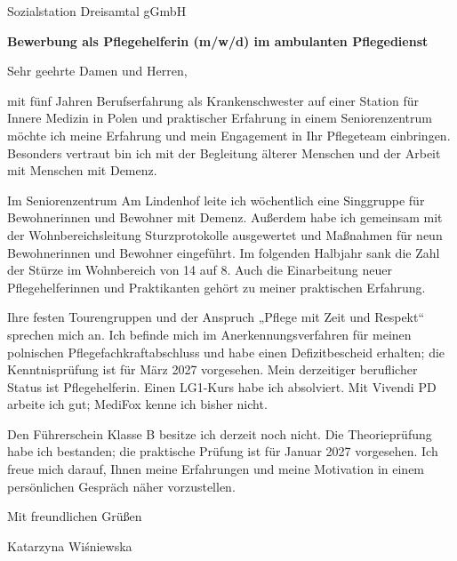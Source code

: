 \documentclass[11pt,a4paper]{article}
\begin{document}
Sozialstation Dreisamtal gGmbH

\vspace{1em}
\textbf{Bewerbung als Pflegehelferin (m/w/d) im ambulanten Pflegedienst}

\vspace{1em}
Sehr geehrte Damen und Herren,

\vspace{0.8em}
mit fünf Jahren Berufserfahrung als Krankenschwester auf einer Station für Innere Medizin in Polen und praktischer Erfahrung in einem Seniorenzentrum möchte ich meine Erfahrung und mein Engagement in Ihr Pflegeteam einbringen. Besonders vertraut bin ich mit der Begleitung älterer Menschen und der Arbeit mit Menschen mit Demenz.

\vspace{0.8em}
Im Seniorenzentrum Am Lindenhof leite ich wöchentlich eine Singgruppe für Bewohnerinnen und Bewohner mit Demenz. Außerdem habe ich gemeinsam mit der Wohnbereichsleitung Sturzprotokolle ausgewertet und Maßnahmen für neun Bewohnerinnen und Bewohner eingeführt. Im folgenden Halbjahr sank die Zahl der Stürze im Wohnbereich von 14 auf 8. Auch die Einarbeitung neuer Pflegehelferinnen und Praktikanten gehört zu meiner praktischen Erfahrung.

\vspace{0.8em}
Ihre festen Tourengruppen und der Anspruch „Pflege mit Zeit und Respekt“ sprechen mich an. Ich befinde mich im Anerkennungsverfahren für meinen polnischen Pflegefachkraftabschluss und habe einen Defizitbescheid erhalten; die Kenntnisprüfung ist für März 2027 vorgesehen. Mein derzeitiger beruflicher Status ist Pflegehelferin. Einen LG1-Kurs habe ich absolviert. Mit Vivendi PD arbeite ich gut; MediFox kenne ich bisher nicht.

\vspace{0.8em}
Den Führerschein Klasse B besitze ich derzeit noch nicht. Die Theorieprüfung habe ich bestanden; die praktische Prüfung ist für Januar 2027 vorgesehen. Ich freue mich darauf, Ihnen meine Erfahrungen und meine Motivation in einem persönlichen Gespräch näher vorzustellen.

\vspace{0.8em}
Mit freundlichen Grüßen

\vspace{1.5em}
Katarzyna Wiśniewska
\end{document}
